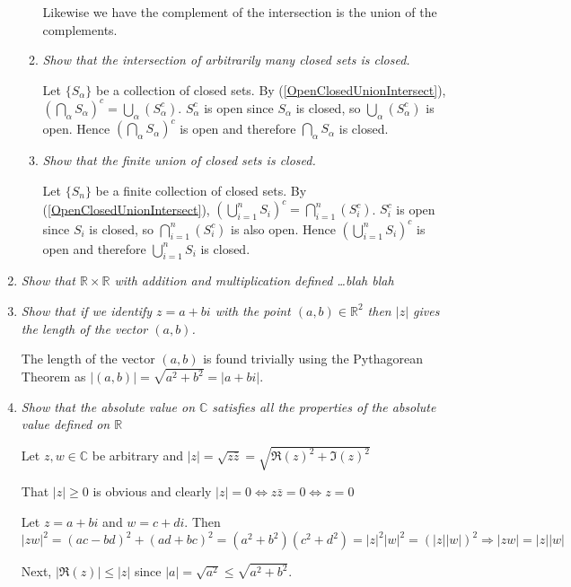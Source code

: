 \documentclass[11pt]{article}
\begin{document}
\begin{enumerate}
\begin{enumerate}
Likewise we have the complement of the intersection is the union of the complements.

\item \emph{Show that the intersection of arbitrarily many closed sets is closed.}

Let $\{S_\alpha\}$ be a collection of closed sets.  By (\ref{OpenClosedUnionIntersect}), $\left(\bigcap_\alpha S_\alpha \right)^c = \bigcup_\alpha \left(S_\alpha^c\right)$.  $S_\alpha^c$ is open since $S_\alpha$ is closed, so  $\bigcup_\alpha \left(S_\alpha^c\right)$ is open.  Hence $\left(\bigcap_\alpha S_\alpha \right)^c$ is open and therefore $\bigcap_\alpha S_\alpha$ is closed.

\item \emph{Show that the finite union of closed sets is closed.}

Let $\{S_n\}$ be a finite collection of closed sets.  By (\ref{OpenClosedUnionIntersect}), $\left(\bigcup_{i=1}^n S_i \right)^c = \bigcap_{i=1}^n \left(S_i^c\right)$.  $S_i^c$ is open since $S_i$ is closed, so $\bigcap_{i=1}^n \left(S_i^c\right)$ is also open.  Hence $\left(\bigcup_{i=1}^n S_i \right)^c$ is open and therefore $\bigcup_{i=1}^n S_i$ is closed.
\end{enumerate}

\item \emph{Show that $\mathbb{R} \times \mathbb{R}$ with addition and multiplication defined \ldots blah blah}

\item \emph{Show that if we identify $z = a + bi$ with the point $(a,b) \in \mathbb{R}^2$ then $|z|$ gives the length of the vector $(a,b)$.}

The length of the vector $(a,b)$ is found trivially using the Pythagorean Theorem as $|(a,b)| = \sqrt{a^2 + b^2} = |a + bi|$.

\item \emph{Show that the absolute value on $\mathbb{C}$ satisfies all the properties of the absolute value defined on $\mathbb{R}$}

Let $z,w \in \mathbb{C}$ be arbitrary and $|z| = \sqrt{z\bar{z}} = \sqrt{\Re(z)^2 + \Im(z)^2}$

That $|z| \geq 0$ is obvious and clearly $|z| = 0 \Leftrightarrow z \bar{z} = 0 \Leftrightarrow z = 0$

Let $z=a+bi$ and $w=c+di$.  Then $|zw|^2 = (ac-bd)^2 + (ad+bc)^2 = (a^2+b^2)(c^2+d^2) = |z|^2|w|^2 = (|z||w|)^2 \Rightarrow |zw| = |z||w|$

Next, $|\Re(z)| \leq |z|$ since $|a| = \sqrt{a^2} \leq \sqrt{a^2 + b^2}$.


\end{enumerate}
\end{document}
